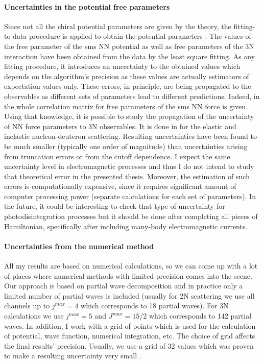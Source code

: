     \paragraph{Uncertainties in the potential free parameters}
    Since not all the chiral potential parameters are given by the theory, the 
    fitting-to-data procedure is applied
    to obtain the potential parameters \cite{reinkrebs2018}. 
    The values of the free parameter of the \gls{sms} NN potential as well as free
    parameters of the  3N  interaction have been obtained from the data by the least square fitting.
    As any fitting procedure, it introduces an uncertainty to the obtained values which depends on the algorithm's precision as
    these values are actually estimators of expectation values only.
    These errors, in principle, are being propagated to the observables as different sets of parameters
    lead to different predictions.
    Indeed, in \cite{reinkrebs2018} the whole correlation matrix for free parameters of the  \gls{sms} NN
    force is given. Using that knowledge, it is possible to study the propagation of the uncertainty of NN
    force parameters to 3N observables. It is done in \cite{skibincki_prc_2018, Volkotrub_2020} for the
    elastic and inelastic nucleon-deuteron scattering.
    Resulting uncertainties have been found to be much smaller (typically one order of magnitude)
    than uncertainties arising from truncation errors or from the cutoff dependence.
    I expect  the same uncertainty level in electromagnetic processes and thus I do not
    intend to study that theoretical error in the presented thesis.
    Moreover, the estimation of such errors is computationally expensive, since it requires 
    significant amount of computer processing power (separate calculations for each set of parameters).
    In the future, it could be interesting to check that type of uncertainty for photodisintegration
    processes but it should be done after completing all pieces of Hamiltonian,
    specifically after including many-body electromagnetic currents.

    \paragraph{Uncertainties from the numerical method}
    All my results are based on numerical calculations,
    so we can come up with a lot of places where numerical methods with limited 
    precision comes into the scene. 
    Our approach is based on partial wave decomposition 
    and in practice only a limited number of partial waves is included 
    (usually for 2N scattering we use all channels up to $j^{max}=4$ which corresponds to 18 partial waves).
    For 3N calculations we use $j^{max}=5$ and $J^{max}=15/2$ which corresponds to 142 partial waves.
    In addition, I work with a grid of points which is used for the calculation of potential, wave function, numerical integration, etc. 
    The choice of grid affects the final results' precision. 
    Usually, we use a grid of 32 values which was proven to make a resulting
    uncertainty very small \cite{Glockle1983}.

